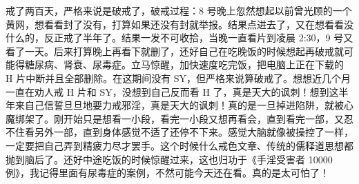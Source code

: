\begin{case}
    戒了两百天，严格来说是破戒了，破戒过程：8 号晚上忽然想起以前曾光顾的一个黄网，想看看封了没有，打算如果还没有封就举报。结果点进去了，又在想看看没什么的，反正戒了半年了。结果一发不可收拾，当晚一直看片到凌晨 2:30，9 号又看了一天。后来打算晚上再看下就删了，还好自己在吃晚饭的时候想起再破戒就可能得糖尿病、肾衰、尿毒症。立马惊醒，加快速度吃完饭，把电脑上正在下载的 H 片中断并且全部删除。在这期间没有 SY，但严格来说算破戒了。想想近几个月一直在劝人戒 H 片和 SY，没想到自己反而看 H 了，真是天大的讽刺！想到这半年来自己信誓旦旦地要力戒邪淫，真是天大的讽刺！真的是一旦掉进陷阱，就被心魔绑架了。刚开始只是想看一小段，看完一小段又想再看会，直到看完一部，又忍不住看另外一部，直到身体感觉不适了还停不下来。感觉大脑就像被操控了一样，一定要把自己弄到精疲力尽才罢手。这个时候什么戒色文章、传统的儒释道思想都抛到脑后了。还好中途吃饭的时候惊醒过来，这也归功于《手淫受害者 10000 例》，我记得里面有尿毒症的案例，不然可能今天还在看。真的是太可怕了！

\end{case}
